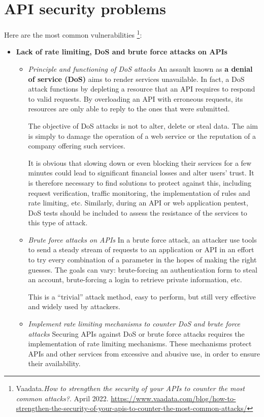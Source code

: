 \section{API security problems}
\label{API problems}
Here are the most common vulnerabilities \footnote{Vaadata.\textit{How to strengthen the security of your APIs to counter the most common attacks?}. April 2022.
\url{https://www.vaadata.com/blog/how-to-strengthen-the-security-of-your-apis-to-counter-the-most-common-attacks/}}:
\begin{itemize}
    \item \textbf{Lack of rate limiting, DoS and brute force attacks on APIs}
    \begin{itemize}
        \item \textit{Principle and functioning of DoS attacks}
        \newline
        An assault known as \textbf{a denial of service (DoS)} aims to render services unavailable. In fact, a DoS attack functions by depleting a resource that an API requires to respond to valid requests. By overloading an API with erroneous requests, its resources are only able to reply to the ones that were submitted.

        The objective of DoS attacks is not to alter, delete or steal data. The aim is simply to damage the operation of a web service or the reputation of a company offering such services.

        It is obvious that slowing down or even blocking their services for a few minutes could lead to significant financial losses and alter users’ trust. It is therefore necessary to find solutions to protect against this, including request verification, traffic monitoring, the implementation of rules and rate limiting, etc. Similarly, during an API or web application pentest, DoS tests should be included to assess the resistance of the services to this type of attack.
        \item \textit{Brute force attacks on APIs}
        \newline
        In a brute force attack, an attacker use tools to send a steady stream of requests to an application or API in an effort to try every combination of a parameter in the hopes of making the right guesses. The goals can vary: brute-forcing an authentication form to steal an account, brute-forcing a login to retrieve private information, etc.

        This is a “trivial” attack method, easy to perform, but still very effective and widely used by attackers.
        \item \textit{Implement rate limiting mechanisms to counter DoS and brute force attacks}
        \newline
        Securing APIs against DoS or brute force attacks requires the implementation of rate limiting mechanisms. These mechanisms protect APIs and other services from excessive and abusive use, in order to ensure their availability.


\end{itemize}
\end{itemize}
